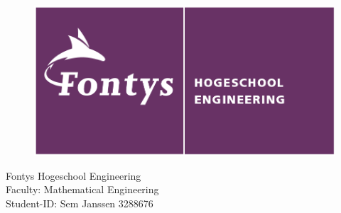 \documentclass[../paper.tex]{subfiles}
\begin{document}
\begin{titlepage}
  \begin{minipage}{.45\linewidth}
    \begin{flushleft}
        \begin{figure}[H]
        \centering
        \includegraphics[scale=0.3]{fontys.png}
        \end{figure}
    \end{flushleft}
  \end{minipage}
  \hfill
  \begin{minipage}{.45\linewidth}
    \begin{flushright}
		Fontys Hogeschool Engineering\\
		Faculty: Mathematical Engineering\\
		Student-ID: Sem Janssen 		3288676\\ 
    \end{flushright} 
  \end{minipage}

\end{titlepage}
\end{document}
